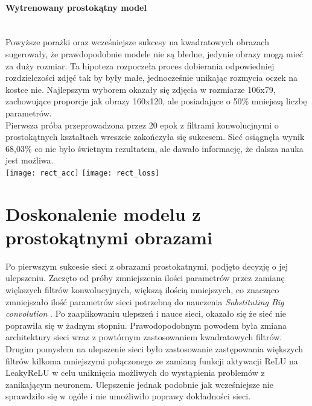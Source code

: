 \paragraph{Wytrenowany prostokątny model} \mbox{}\\
Powyższe porażki oraz wcześniejsze sukcesy na kwadratowych obrazach sugerowały, że
prawdopodobnie modele nie są błedne, jedynie obrazy mogą mieć za duży rozmiar. Ta hipoteza
rozpoczeła proces dobierania odpowiedniej rozdzielczości zdjęć tak by były małe, jednocześnie
unikając rozmycia oczek na kostce nie. Najlepszym wyborem okazały się zdjęcia w rozmiarze 106x79,
zachowujące proporcje jak obrazy 160x120, ale posiadające o 50\% mniejszą liczbę parametrów.\\
Pierwsza próba przeprowadzona przez 20 epok z filtrami konwolucjnymi o prostokątnych
kształtach wreszcie zakończyła się sukcesem. Sieć osiągnęła wynik 68,03\% co nie
było świetnym rezultatem, ale dawało informację, że dalsza nauka jest możliwa.\\
\texttt{[image: rect\_acc]}
\texttt{[image: rect\_loss]}

\section{Doskonalenie modelu z prostokątnymi obrazami}
Po pierwszym sukcesie sieci z obrazami prostokatnymi, podjęto decyzję o jej ulepszeniu.
Zaczęto od próby zmniejszenia ilości parametrów przez zamianę większych filtrów konwolucyjnych,
większą ilością mniejszych, co znacząco zmniejszało ilość parametrów sieci potrzebną do nauczenia
\textit{Substituting Big convolution} \cite{substBigConv}.
Po zaaplikowaniu ulepszeń i nauce sieci, okazało się że sieć nie poprawiła się w żadnym
stopniu. Prawodopodobnym powodem była zmiana architektury sieci wraz z powtórnym
zastosowaniem kwadratowych filtrów.\\
Drugim pomysłem na ulepszenie sieci było zastosowanie zastępowania większych filtrów
kilkoma mniejszymi połączonego ze zamianą funkcji aktywacji ReLU na LeakyReLU w celu uniknięcia
możliwych do wystąpienia problemów z zanikającym neuronem. Ulepszenie jednak podobnie
jak wcześniejsze nie sprawdziło się w ogóle i nie umożliwiło poprawy dokładności sieci.

